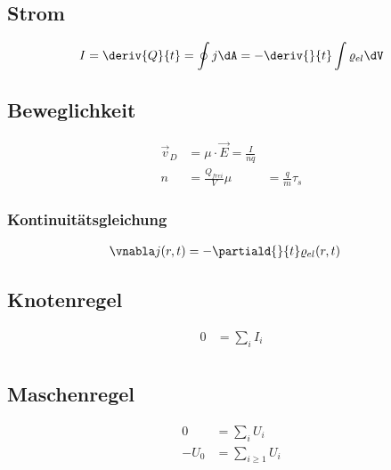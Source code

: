 \documentclass[11pt,letterpaper]{article}
\begin{document}
\subsection{Strom}
\begin{align*}
    I &= \deriv{Q}{t} = \oint j \dA = - \deriv{}{t}\int \varrho_{el} \dV\\
\end{align*}

\subsection{Beweglichkeit}
\begin{align*}
    \vec v_D &= \mu \cdot \vec E = \frac{I}{n q}\\ %
    n &= \frac{Q_{frei}}{V}
    \mu &= \frac{ q }{m } \tau_s %
\end{align*}

\subsubsection{Kontinuitätsgleichung}
\begin{align*}
    \vnabla j(r,t) &= - \partiald{}{t} \varrho_{el}(r,t)
\end{align*}

\subsection{Knotenregel}
\begin{align*}
    0 &= \sum_i I_i\\
\end{align*}

\subsection{Maschenregel}
\begin{align*}
    0 &= \sum_i U_i\\
    -U_0 &= \sum_{i\ge1} U_i
\end{align*}
 
\end{document}
